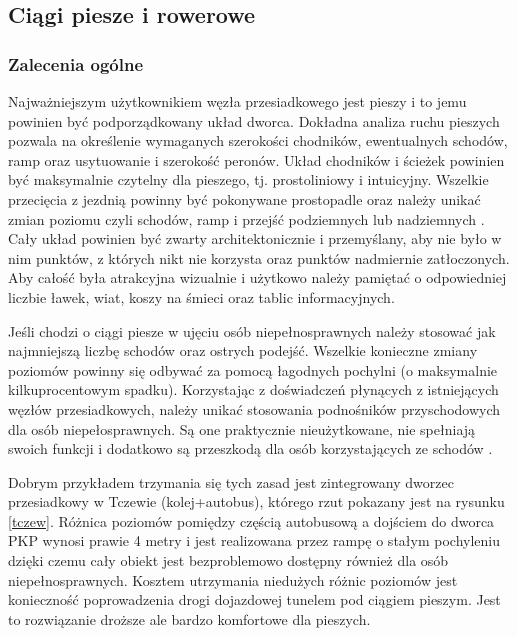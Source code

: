 \documentclass[twoside,12pt]{article}
\begin{document}
	\clearpage
	\subsection{Ciągi piesze i rowerowe} \label{sec:ciagi_piesze}
	
	\subsubsection{Zalecenia ogólne}
	
	Najważniejszym użytkownikiem węzła przesiadkowego jest pieszy i to jemu powinien być podporządkowany układ dworca. Dokładna analiza ruchu pieszych pozwala na określenie wymaganych szerokości chodników, ewentualnych schodów, ramp oraz usytuowanie i szerokość peronów. Układ chodników i ścieżek powinien być maksymalnie czytelny dla pieszego, tj. prostoliniowy i intuicyjny. Wszelkie przecięcia z jezdnią powinny być pokonywane prostopadle oraz należy unikać zmian poziomu czyli schodów, ramp i przejść podziemnych lub nadziemnych  \cite{zaluski}. Cały układ powinien być zwarty architektonicznie i przemyślany, aby nie było w nim punktów, z których nikt nie korzysta oraz punktów nadmiernie zatłoczonych. Aby całość była atrakcyjna wizualnie i użytkowo należy pamiętać o odpowiedniej liczbie ławek, wiat, koszy na śmieci oraz tablic informacyjnych. 
	
	Jeśli chodzi o ciągi piesze w ujęciu osób niepełnosprawnych należy stosować jak najmniejszą liczbę schodów oraz ostrych podejść. Wszelkie konieczne zmiany poziomów powinny się odbywać za pomocą łagodnych pochylni (o maksymalnie kilkuprocentowym spadku). Korzystając z doświadczeń płynących z istniejących węzłów przesiadkowych, należy unikać stosowania podnośników przyschodowych dla osób niepełosprawnych. Są one praktycznie nieużytkowane, nie spełniają swoich funkcji i dodatkowo są przeszkodą dla osób korzystających ze schodów \cite{zaluski}. 
	
	Dobrym przykładem trzymania się tych zasad jest zintegrowany dworzec przesiadkowy w Tczewie (kolej+autobus), którego rzut pokazany jest na rysunku \ref{tczew}. Różnica poziomów pomiędzy częścią autobusową a dojściem do dworca PKP wynosi prawie 4 metry i jest realizowana przez rampę o stałym pochyleniu dzięki czemu cały obiekt jest bezproblemowo dostępny również dla osób niepełnosprawnych. Kosztem utrzymania niedużych różnic poziomów jest konieczność poprowadzenia drogi dojazdowej tunelem pod ciągiem pieszym. Jest to rozwiązanie droższe ale bardzo komfortowe dla pieszych.
	
\end{document}
